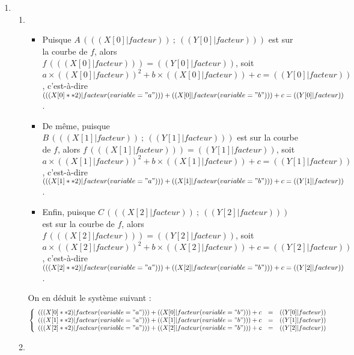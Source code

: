 \exercice*
\begin{enumerate}

  \item
    \begin{enumerate}
      \item
        \begin{itemize}
          \item Puisque $A\,( (( X[0]|facteur ))~;~(( Y[0]|facteur )) )$ est sur la courbe de $f$, alors $f\,( (( X[0]|facteur )) )=(( Y[0]|facteur ))$, soit
            $a \times (( X[0]|facteur ))^2+b\times (( X[0]|facteur ))+c=(( Y[0]|facteur ))$,
            c'est-à-dire $(( (X[0]**2)|facteur(variable="a") )) + (( X[0]|facteur(variable="b") )) + c = (( Y[0]|facteur ))$.
          \item De même, puisque $B\,( (( X[1]|facteur ))~;~(( Y[1]|facteur )) )$ est sur la courbe de $f$, alors $f\,( (( X[1]|facteur )) )=(( Y[1]|facteur ))$, soit
            $a \times (( X[1]|facteur ))^2+b\times (( X[1]|facteur ))+c=(( Y[1]|facteur ))$,
            c'est-à-dire $(( (X[1]**2)|facteur(variable="a") )) + (( X[1]|facteur(variable="b") )) + c = (( Y[1]|facteur ))$.
          \item Enfin, puisque $C\,( (( X[2]|facteur ))~;~(( Y[2]|facteur )) )$ est sur la courbe de $f$, alors $f\,( (( X[2]|facteur )) )=(( Y[2]|facteur ))$, soit
            $a \times (( X[2]|facteur ))^2+b\times (( X[2]|facteur ))+c=(( Y[2]|facteur ))$,
            c'est-à-dire $(( (X[2]**2)|facteur(variable="a") )) + (( X[2]|facteur(variable="b") )) + c = (( Y[2]|facteur ))$.
        \end{itemize}

        On en déduit le système suivant :
        \[ \left\{\begin{array}{rcl}
            (( (X[0]**2)|facteur(variable="a") )) + (( X[0]|facteur(variable="b") )) + c &=& (( Y[0]|facteur )) \\
            (( (X[1]**2)|facteur(variable="a") )) + (( X[1]|facteur(variable="b") )) + c &=& (( Y[1]|facteur )) \\
            (( (X[2]**2)|facteur(variable="a") )) + (( X[2]|facteur(variable="b") )) + c &=& (( Y[2]|facteur )) \\
        \end{array}\right.\]
      \item


\end{enumerate}
\end{enumerate}
